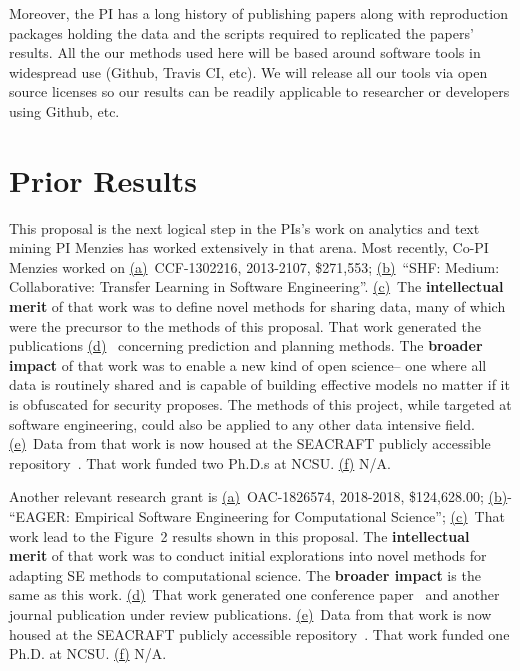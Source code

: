 \documentclass{NSF}
\begin{document}
\begin{nsfdescription}
Moreover, the PI has a long history of publishing papers along with reproduction packages holding the data and the scripts required to replicated the papers' results. 
All the our methods used here will be based around software tools in widespread use (Github, Travis CI, etc). 
We will release all our tools via open source licenses so our results can be readily applicable to researcher or developers using Github, etc. 

 
\section{Prior Results}
\label{sec:PriorResults}



This proposal is the next logical step in the PIs's work on analytics and text mining
{PI Menzies} has worked extensively in that arena.
Most  recently, Co-PI Menzies worked on \underline{(a)}~CCF-1302216, 2013-2107, \$271,553;   \underline{(b)}~``SHF: Medium: Collaborative: Transfer Learning in Software Engineering''. 
\underline{(c)}~The {\bf intellectual merit} of that work was to
define novel methods for sharing data, many of which were the precursor to the methods of this proposal.  That work generated the publications  \underline{(d)}~\cite{krishna2018bellwethers,PetersML15,krishna16,he13,Me17,fu2016tuning,krishna2017learning} concerning prediction and planning methods.
The {\bf broader impact} of that work was to
enable a new kind of open science-- one where all data is routinely shared and is capable of building effective models no matter if it is obfuscated for security proposes.
The methods of this project, while targeted at software engineering, could also be applied to any other data intensive field.   
 \underline{(e)}~Data from that work is now housed at the SEACRAFT publicly accessible repository~\cite{seacraft}. That work  funded two Ph.D.s at NCSU. \underline{(f)}
N/A.  

Another relevant research grant is 
\underline{(a)}~OAC-1826574, 2018-2018, 
\$124,628.00;
\underline{(b)}-
``EAGER: Empirical Software Engineering for Computational Science'';
\underline{(c)}~That work lead to the Figure~2 results
shown in this proposal.
The {\bf intellectual merit} of that work was to
conduct initial explorations into novel methods for adapting SE methods to computational science.
The {\bf broader impact} is the same as this work.
\underline{(d)}~That work generated one conference paper~\cite{abs-1807-11112}
and another journal publication under review publications.
 \underline{(e)}~Data from that work is now housed at the SEACRAFT publicly accessible repository~\cite{seacraft}. That work  funded one Ph.D. at NCSU. 
 \underline{(f)} N/A.  






\end{nsfdescription}
\end{document}
